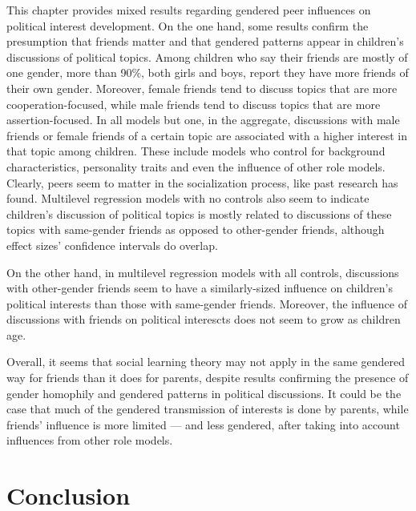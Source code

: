 \documentclass[
  letterpaper,
  DIV=11,
  numbers=noendperiod]{scrreprt}
\begin{document}
This chapter provides mixed results regarding gendered peer influences
on political interest development. On the one hand, some results confirm
the presumption that friends matter and that gendered patterns appear in
children's discussions of political topics. Among children who say their
friends are mostly of one gender, more than 90\%, both girls and boys,
report they have more friends of their own gender. Moreover, female
friends tend to discuss topics that are more cooperation-focused, while
male friends tend to discuss topics that are more assertion-focused. In
all models but one, in the aggregate, discussions with male friends or
female friends of a certain topic are associated with a higher interest
in that topic among children. These include models who control for
background characteristics, personality traits and even the influence of
other role models. Clearly, peers seem to matter in the socialization
process, like past research has found. Multilevel regression models with
no controls also seem to indicate children's discussion of political
topics is mostly related to discussions of these topics with same-gender
friends as opposed to other-gender friends, although effect sizes'
confidence intervals do overlap.

On the other hand, in multilevel regression models with all controls,
discussions with other-gender friends seem to have a similarly-sized
influence on children's political interests than those with same-gender
friends. Moreover, the influence of discussions with friends on
political interescts does not seem to grow as children age.

Overall, it seems that social learning theory may not apply in the same
gendered way for friends than it does for parents, despite results
confirming the presence of gender homophily and gendered patterns in
political discussions. It could be the case that much of the gendered
transmission of interests is done by parents, while friends' influence
is more limited --- and less gendered, after taking into account
influences from other role models.


\chapter{Conclusion}\label{sec-chap6}
\end{document}
